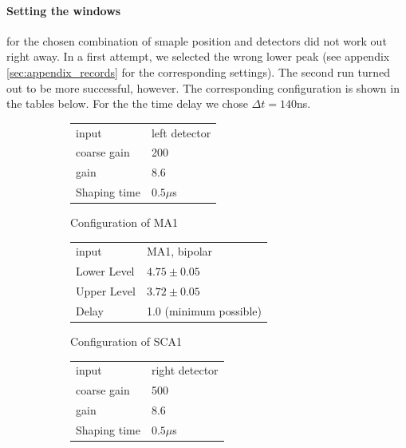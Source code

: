 \paragraph{Setting the windows} for the chosen combination of smaple position and detectors did 
not work out right away. In a first attempt, we selected the wrong lower peak (see appendix 
    \ref{sec:appendix_records} for the corresponding settings). 
The second run turned out to be more successful, however. The corresponding configuration is 
shown in the tables below. For the the time delay we chose
$\Delta t = 140$ns.
\begin{figure}[h]
    \centering
    \begin{subfigure}[b]{0.4\linewidth}
        \begin{tabular}{|l|l|}
            \hline
            input           & left detector \\ 
            coarse gain     & 200 \\
            gain            & 8.6 \\
            Shaping time    & $0.5\mu$s \\
            \hline
        \end{tabular}
        \caption{Configuration of MA1}
    \end{subfigure}\qquad
    \begin{subfigure}[b]{0.4\linewidth}
        \begin{tabular}{|l|l|}
            \hline
            input           & MA1, bipolar \\ 
            Lower Level     & $4.75\pm0.05$ \\
            Upper Level     & $3.72\pm0.05$ \\
            Delay           & 1.0 (minimum possible) \\
            \hline
        \end{tabular}
        \caption{Configuration of SCA1}
    \end{subfigure}
    \begin{subfigure}[b]{0.4\linewidth}
        \begin{tabular}{|l|l|}
            \hline
            input           & right detector \\ 
            coarse gain     & 500 \\
            gain            & 8.6 \\
            Shaping time    & $0.5\mu$s \\
            \hline
        \end{tabular}

\end{subfigure}
\end{figure}
